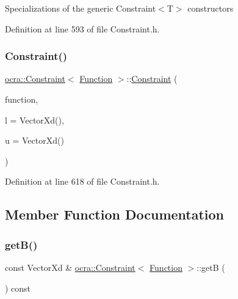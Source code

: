 Specializations of the generic Constraint$<$\+T$>$ constructors 

Definition at line 593 of file Constraint.\+h.

\hypertarget{classocra_1_1Constraint_3_01Function_01_4_a9b8a02fdfb62c2d3d774552baccd268b}{}\label{classocra_1_1Constraint_3_01Function_01_4_a9b8a02fdfb62c2d3d774552baccd268b} 
\subsubsection{\texorpdfstring{Constraint()}{Constraint()}\hspace{0.1cm}{\footnotesize\ttfamily [2/2]}}
{\footnotesize\ttfamily \hyperlink{classocra_1_1Constraint}{ocra\+::\+Constraint}$<$ \hyperlink{classocra_1_1Function}{Function} $>$\+::\hyperlink{classocra_1_1Constraint}{Constraint} (\begin{DoxyParamCaption}\item[{\hyperlink{classocra_1_1Function}{Function} $\ast$}]{function,  }\item[{const Vector\+Xd \&}]{l = {\ttfamily VectorXd()},  }\item[{const Vector\+Xd \&}]{u = {\ttfamily VectorXd()} }\end{DoxyParamCaption})\hspace{0.3cm}{\ttfamily [inline]}}



Definition at line 618 of file Constraint.\+h.



\subsection{Member Function Documentation}
\hypertarget{classocra_1_1Constraint_3_01Function_01_4_a18ee02ca835269c8b648519be8a663ce}{}\label{classocra_1_1Constraint_3_01Function_01_4_a18ee02ca835269c8b648519be8a663ce} 
\subsubsection{\texorpdfstring{get\+B()}{getB()}}
{\footnotesize\ttfamily const Vector\+Xd \& \hyperlink{classocra_1_1Constraint}{ocra\+::\+Constraint}$<$ \hyperlink{classocra_1_1Function}{Function} $>$\+::getB (\begin{DoxyParamCaption}{ }\end{DoxyParamCaption}) const\hspace{0.3cm}{\ttfamily [inline]}}

